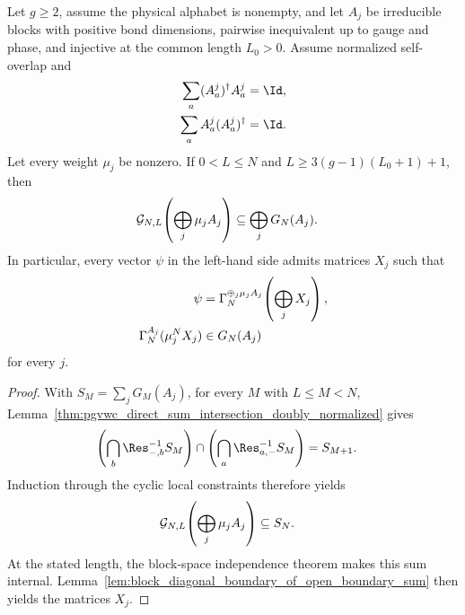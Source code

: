 \begin{lemma}
    \label{thm:bnt_block_diagonal_open_boundary_matrices_source_length_doubly_normalized}
    \leanok
    Let $g\ge2$, assume the physical alphabet is nonempty, and let $A_j$
    be irreducible blocks with positive bond dimensions, pairwise inequivalent
    up to gauge and phase, and injective at the common length $L_0>0$. Assume
    normalized self-overlap and
    \begin{align}
        \sum_a(A^j_a)^\dagger A^j_a & =\Id,
        \notag                              \\
        \sum_aA^j_a(A^j_a)^\dagger  & =\Id.
        \notag
    \end{align}
    Let every weight $\mu_j$ be nonzero. If $0<L\le N$ and
    $L\ge3(g-1)(L_0+1)+1$, then
    \begin{align}
        \mathcal G_{N,L}\!\left(\bigoplus_j\mu_jA_j\right)
         & \subseteq\bigoplus_jG_N(A_j).
        \notag
    \end{align}
    In particular, every vector $\psi$ in the left-hand side admits matrices
    $X_j$ such that
    \begin{align}
        \psi
         & =\Gamma_N^{\oplus_j\mu_jA_j}\!\left(\bigoplus_jX_j\right),
        \notag                                                        \\
        \Gamma_N^{A_j}(\mu_j^NX_j)
         & \in G_N(A_j)
        \notag
    \end{align}
    for every $j$.
\end{lemma}

\begin{proof}\leanok
    With $S_M=\sum_jG_M(A_j)$, for every $M$ with $L\le M<N$,
    Lemma~\ref{thm:pgvwc_direct_sum_intersection_doubly_normalized} gives
    \begin{align}
        \left(\bigcap_b\Res_{-,b}^{-1}S_M\right)
        \cap
        \left(\bigcap_a\Res_{a,-}^{-1}S_M\right)
         & =S_{M+1}.
        \notag
    \end{align}
    Induction through the cyclic local constraints therefore yields
    \begin{align}
        \mathcal G_{N,L}\!\left(\bigoplus_j\mu_jA_j\right)
         & \subseteq S_N.
        \notag
    \end{align}
    At the stated length, the block-space independence theorem makes this sum
    internal. Lemma~\ref{lem:block_diagonal_boundary_of_open_boundary_sum}
    then yields the matrices $X_j$.
\end{proof}

